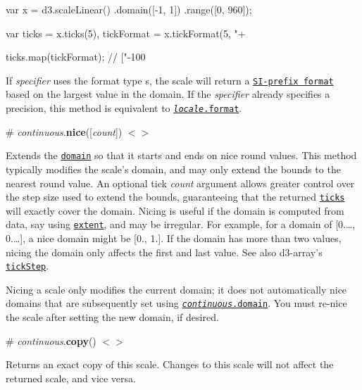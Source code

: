 \begin{DoxyCode}
var x = d3.scaleLinear()
    .domain([-1, 1])
    .range([0, 960]);

var ticks = x.ticks(5),
    tickFormat = x.tickFormat(5, "+%

ticks.map(tickFormat); // ["-100%
\end{DoxyCode}


If {\itshape specifier} uses the format type {\ttfamily s}, the scale will return a \href{https://github.com/d3/d3-format#locale_formatPrefix}{\tt S\+I-\/prefix format} based on the largest value in the domain. If the {\itshape specifier} already specifies a precision, this method is equivalent to \href{https://github.com/d3/d3-format#locale_format}{\tt {\itshape locale}.format}.

\label{_continuous_nice}%
\# {\itshape continuous}.{\bfseries nice}(\mbox{[}{\itshape count}\mbox{]}) \href{https://github.com/d3/d3-scale/blob/master/src/nice.js}{\tt $<$$>$}

Extends the \href{#continuous_domain}{\tt domain} so that it starts and ends on nice round values. This method typically modifies the scale’s domain, and may only extend the bounds to the nearest round value. An optional tick {\itshape count} argument allows greater control over the step size used to extend the bounds, guaranteeing that the returned \href{#continuous_ticks}{\tt ticks} will exactly cover the domain. Nicing is useful if the domain is computed from data, say using \href{https://github.com/d3/d3-array#extent}{\tt extent}, and may be irregular. For example, for a domain of \mbox{[}0.…, 0.…\mbox{]}, a nice domain might be \mbox{[}0., 1.\mbox{]}. If the domain has more than two values, nicing the domain only affects the first and last value. See also d3-\/array’s \href{https://github.com/d3/d3-array#tickStep}{\tt tick\+Step}.

Nicing a scale only modifies the current domain; it does not automatically nice domains that are subsequently set using \href{#continuous_domain}{\tt {\itshape continuous}.domain}. You must re-\/nice the scale after setting the new domain, if desired.

\label{_continuous_copy}%
\# {\itshape continuous}.{\bfseries copy}() \href{https://github.com/d3/d3-scale/blob/master/src/continuous.js#L59}{\tt $<$$>$}

Returns an exact copy of this scale. Changes to this scale will not affect the returned scale, and vice versa.

